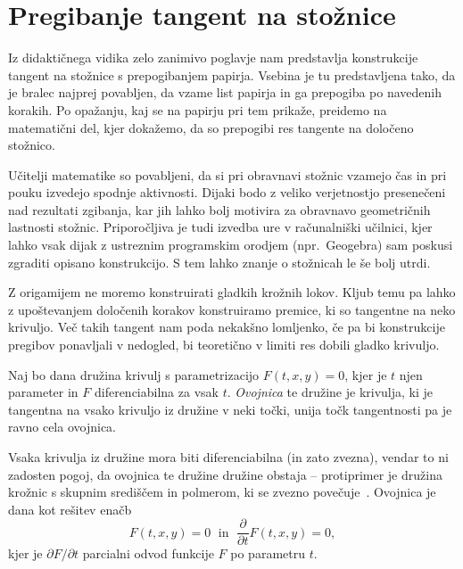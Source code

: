 \section{Pregibanje tangent na stožnice}
\label{pogl:stoznice}

Iz didaktičnega vidika zelo zanimivo poglavje nam predstavlja konstrukcije tangent na stožnice s prepogibanjem papirja. Vsebina je tu predstavljena tako, da je bralec najprej povabljen, da vzame list papirja in ga prepogiba po navedenih korakih. Po opažanju, kaj se na papirju pri tem prikaže, preidemo na matematični del, kjer dokažemo, da so prepogibi res tangente na določeno stožnico.

Učitelji matematike so povabljeni, da si pri obravnavi stožnic vzamejo čas in pri pouku izvedejo spodnje aktivnosti. Dijaki bodo z veliko verjetnostjo presenečeni nad rezultati zgibanja, kar jih lahko bolj motivira za obravnavo geometričnih lastnosti stožnic. Priporočljiva je tudi izvedba ure v računalniški učilnici, kjer lahko vsak dijak z ustreznim programskim orodjem (npr.\ Geogebra) sam poskusi zgraditi opisano konstrukcijo. S tem lahko znanje o stožnicah le še bolj utrdi.

Z origamijem ne moremo konstruirati gladkih krožnih lokov. Kljub temu pa lahko z upoštevanjem določenih korakov konstruiramo premice, ki so tangentne na neko krivuljo. Več takih tangent nam poda nekakšno lomljenko, če pa bi konstrukcije pregibov ponavljali v nedogled, bi teoretično v limiti res dobili gladko krivuljo.

\begin{definicija}
    \label{def:ovojnica}
    Naj bo dana družina krivulj s parametrizacijo $F(t, x, y) = 0$, kjer je $t$ njen parameter in $F$ diferenciabilna za vsak $t$. \emph{Ovojnica} te družine je krivulja, ki je tangentna na vsako krivuljo iz družine v neki točki, unija točk tangentnosti pa je ravno cela ovojnica.
\end{definicija}

\begin{opomba}
    Vsaka krivulja iz družine mora biti diferenciabilna (in zato zvezna), vendar to ni zadosten pogoj, da ovojnica te družine družine obstaja -- protiprimer je družina krožnic s skupnim središčem in polmerom, ki se zvezno povečuje~\cite{wikienvelope}. Ovojnica je dana kot rešitev enačb
    $$ F(t, x, y) = 0 \; \text{ in } \; \frac{\partial}{\partial t} F(t, x, y) = 0, $$
    kjer je $\partial F / \partial t$ parcialni odvod funkcije $F$ po parametru $t$.
\end{opomba}

